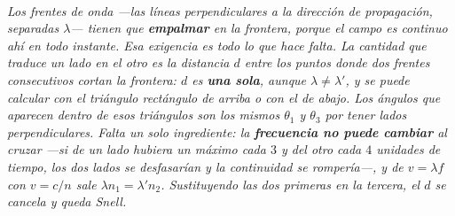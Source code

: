\begin{center}
\begin{tikzpicture}[scale=1]
\end{tikzpicture}\\[0.5em]
{\small\itshape Los frentes de onda ---las líneas perpendiculares a la
dirección de propagación, separadas $\lambda$--- tienen que \textbf{empalmar} en
la frontera, porque el campo es continuo ahí en todo instante. Esa exigencia es
todo lo que hace falta. La cantidad que traduce un lado en el otro es la
distancia $d$ entre los puntos donde dos frentes consecutivos cortan la
frontera: $d$ es \textbf{una sola}, aunque $\lambda \neq \lambda'$, y se puede
calcular con el triángulo rectángulo de arriba o con el de abajo. Los ángulos
que aparecen dentro de esos triángulos son los mismos $\theta_1$ y $\theta_3$ por
tener lados perpendiculares. Falta un solo ingrediente: la \textbf{frecuencia no
puede cambiar} al cruzar ---si de un lado hubiera un máximo cada $3$ y del otro
cada $4$ unidades de tiempo, los dos lados se desfasarían y la continuidad se
rompería---, y de $v = \lambda f$ con $v = c/n$ sale $\lambda n_1 = \lambda' n_2$.
Sustituyendo las dos primeras en la tercera, el $d$ se cancela y queda Snell.}
\end{center}
